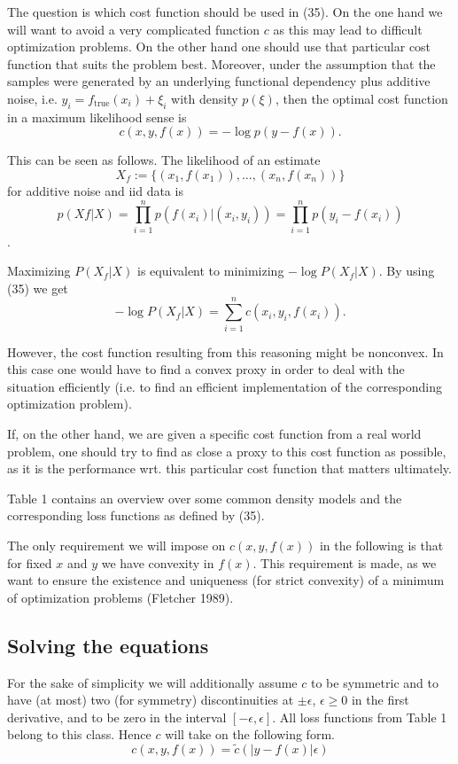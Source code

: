 \documentclass[fleqn,10pt]{olplainarticle}
\begin{document}
The question is which cost function should be used in (35). On
the one hand we will want to avoid a very complicated function $c$ as this may lead to difficult optimization problems. On the other hand one should use that particular cost function that suits the problem best. Moreover, under the assumption that the samples were generated by an underlying functional dependency plus additive noise, i.e. $y_i = f_{\text{true}}(x_i) + \xi_i$ with density $p(\xi)$, then the optimal cost function in a maximum likelihood sense is
\[ c(x, y, f (x)) = -\log p(y - f (x)). \]

This can be seen as follows. The likelihood of an estimate
\[ X_f := \{(x_1, f (x_1)), \ldots, (x_n, f (x_n))\} \]
for additive noise and iid data is
\[p(X f | X) = \prod_{i=1}^n p(f(x_i) | (x_i, y_i)) = \prod_{i=1}^n p(y_i - f(x_i))\].

Maximizing $P(X_f |X)$ is equivalent to minimizing $-\log P(X_f |X)$. By using (35) we get
\[ -\log P(X_f |X) = \sum_{i=1}^{n} c(x_i, y_i, f (x_i)). \]

However, the cost function resulting from this reasoning might be nonconvex. In this case one would have to find a convex proxy in order to deal with the situation efficiently (i.e. to find an efficient implementation of the corresponding optimization problem).

If, on the other hand, we are given a specific cost function from a real world problem, one should try to find as close a proxy to this cost function as possible, as it is the performance wrt. this particular cost function that matters ultimately.

Table 1 contains an overview over some common density models and the corresponding loss functions as defined by (35).

The only requirement we will impose on $c(x, y, f (x))$ in the
following is that for fixed $x$ and $y$ we have convexity in $f (x)$.
This requirement is made, as we want to ensure the existence and
uniqueness (for strict convexity) of a minimum of optimization
problems (Fletcher 1989).

\subsection{Solving the equations}
For the sake of simplicity we will additionally assume $c$ to be symmetric and to have (at most) two (for symmetry) discontinuities at $\pm\epsilon$, $\epsilon \geq 0$ in the first derivative, and to be zero in the interval $[-\epsilon, \epsilon]$. All loss functions from Table 1 belong to this class. Hence $c$ will take on the following form.
\[ c(x, y, f (x)) = \tilde{c}(|y - f (x)|\epsilon) \tag{41} \]
\end{document}
